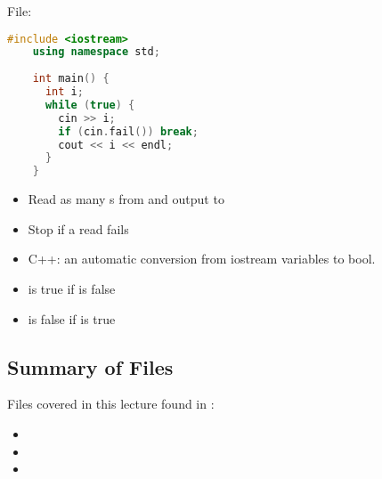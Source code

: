 File: 
\begin{lstlisting}[language = C++]
    #include <iostream>
    using namespace std;
    
    int main() {
      int i;
      while (true) {
        cin >> i;
        if (cin.fail()) break;
        cout << i << endl;
      }
    }
\end{lstlisting}
\begin{itemize}
    \item Read as many s from  and output to 
    \item Stop if a read fails
\end{itemize}

\begin{itemize}
    \item C++: an automatic conversion from iostream variables to bool.
    \item {} is true if  is false
    \item {} is false if  is true
\end{itemize}

\subsection{Summary of Files}
Files covered in this lecture found in :
\begin{itemize}
    \item {}
    \item {}
    \item {}
\end{itemize}
